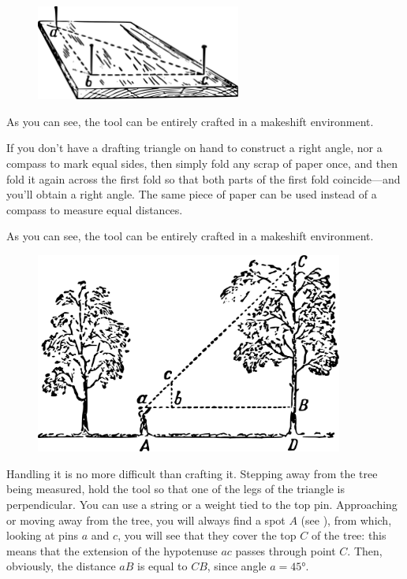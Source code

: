 \begin{figure}[h!]
\centering
\includegraphics[width=0.6\textwidth]{figures/ch-01/fig-01-04.pdf}
\end{figure}


As you can see, the tool can be entirely crafted in a makeshift environment.

If you don't have a drafting triangle on hand to construct a right angle, nor a compass to mark equal sides, then simply fold any scrap of paper once, and then fold it again across the first fold so that both parts of the first fold coincide—and you'll obtain a right angle. The same piece of paper can be used instead of a compass to measure equal distances.

As you can see, the tool can be entirely crafted in a makeshift environment.

\begin{figure}[h!]
\centering
\includegraphics[width=0.9\textwidth]{figures/ch-01/fig-01-05.pdf}
\end{figure}

Handling it is no more difficult than crafting it. Stepping away from the tree being measured, hold the tool so that one of the legs of the triangle is perpendicular. You can use a string or a weight tied to the top pin. Approaching or moving away from the tree, you will always find a spot $A$ (see ), from which, looking at pins $a$ and $c$, you will see that they cover the top $C$ of the tree: this means that the extension of the hypotenuse $ac$ passes through point $C$. Then, obviously, the distance $aB$ is equal to $CB$, since angle $a = \ang{45}$. 

